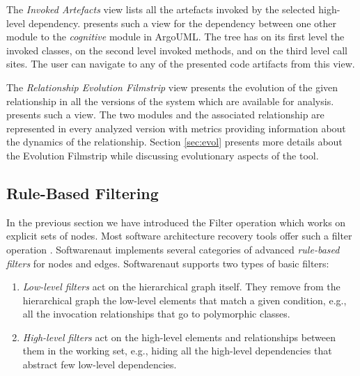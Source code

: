 \documentclass[preprint,12pt]{elsarticle}
\begin{document}
\begin{description}

\item The {\em Invoked Artefacts} view lists all the artefacts invoked by the selected high-level dependency.  presents such a view for the dependency between one other module to the {\em cognitive} module in ArgoUML. The tree has on its first level the invoked classes, on the second level invoked methods, and on the third level call sites. The user can navigate to any of the presented code artifacts from this view.

\item The {\em Relationship Evolution Filmstrip} view presents the evolution of the given relationship in all the versions of the system which are available for analysis.  presents such a view. The two modules and the associated relationship are represented in every analyzed version with metrics providing information about the dynamics of the relationship. Section \ref{sec:evol} presents more details about the Evolution Filmstrip while discussing evolutionary aspects of the tool.

\end{description}


\subsection {Rule-Based Filtering} 

In the previous section we have introduced the Filter operation which works on explicit sets of nodes. Most software architecture recovery tools offer such a filter operation \cite{aracic-filtering}. Softwarenaut implements several categories of advanced {\em rule-based filters} for nodes and edges. Softwarenaut supports two types of basic filters: 

\begin{enumerate}

\item {\em Low-level filters} act on the hierarchical graph itself. They remove from the hierarchical graph the low-level elements that match a given condition, e.g., all the invocation relationships that go to polymorphic classes.

\item {\em High-level filters} act on the high-level elements and relationships between them in the working set, e.g., hiding all the high-level dependencies that abstract few low-level dependencies.

\end{enumerate}
\end{document}
